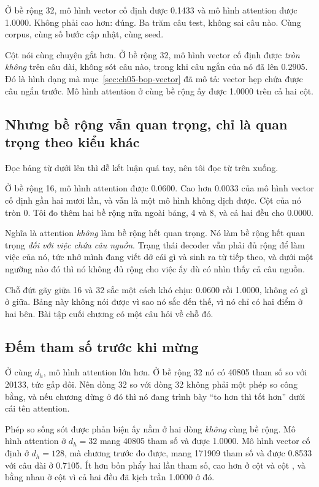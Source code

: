 %
Ở bề rộng 32, mô hình vector cố định được 0.1433 và mô hình attention được
1.0000. Không phải cao hơn: đúng. Ba trăm câu test, không sai câu nào. Cùng
corpus, cùng số bước cập nhật, cùng seed.

Cột  nói cùng chuyện gắt hơn. Ở bề rộng 32, mô hình vector cố định
được \emph{tròn không} trên câu dài, không sót câu nào, trong khi câu ngắn của
nó đã lên 0.2905. Đó là hình dạng mà mục~\ref{sec:ch05-bop-vector} đã mô tả:
vector hẹp chứa được câu ngắn trước. Mô hình attention ở cùng bề rộng ấy được
1.0000 trên cả hai cột.

\subsection*{Nhưng bề rộng vẫn quan trọng, chỉ là quan trọng theo kiểu khác}

%
Đọc bảng từ dưới lên thì dễ kết luận quá tay, nên tôi đọc từ trên xuống.

Ở bề rộng 16, mô hình attention được 0.0600. Cao hơn 0.0033 của mô hình vector
cố định gần hai mươi lần, và vẫn là một mô hình không dịch được. Cột
 của nó tròn 0. Tôi đo thêm hai bề rộng nữa ngoài bảng, 4 và 8, và
cả hai đều cho 0.0000.

Nghĩa là attention \emph{không} làm bề rộng hết quan trọng. Nó làm bề rộng hết
quan trọng \emph{đối với việc chứa câu nguồn}. Trạng thái decoder vẫn phải đủ
rộng để làm việc của nó, tức nhớ mình đang viết dở cái gì và sinh ra từ tiếp
theo, và dưới một ngưỡng nào đó thì nó không đủ rộng cho việc ấy dù có nhìn
thấy cả câu nguồn.

Chỗ đứt gãy giữa 16 và 32 sắc một cách khó chịu: 0.0600 rồi 1.0000, không có gì
ở giữa. Bảng này không nói được vì sao nó sắc đến thế, vì nó chỉ có hai điểm ở
hai bên. Bài tập cuối chương có một câu hỏi về chỗ đó.

\subsection*{Đếm tham số trước khi mừng}

%
Ở cùng \(d_h\), mô hình attention lớn hơn. Ở bề rộng 32 nó có 40805 tham số so
với 20133, tức gấp đôi. Nên dòng 32 so với dòng 32 không phải một phép so công
bằng, và nếu chương dừng ở đó thì nó đang trình bày \enquote{to hơn thì tốt
hơn} dưới cái tên attention.

Phép so sống sót được phản biện ấy nằm ở hai dòng \emph{không} cùng bề rộng.
Mô hình attention ở \(d_h = 32\) mang 40805 tham số và được 1.0000. Mô hình
vector cố định ở \(d_h = 128\), mà chương trước đo được, mang 171909 tham số và
được 0.8533 với câu dài ở 0.7105. Ít hơn bốn phẩy hai lần tham số, cao hơn ở
cột  và cột , và bằng nhau ở cột  vì cả hai
đều đã kịch trần 1.0000 ở đó.

